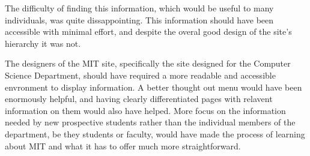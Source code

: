 The difficulty of finding this information, which would be useful to many individuals, was
quite dissappointing. This information should have been accessible with minimal effort, and
despite the overal good design of the site's hierarchy it was not.

The designers of the MIT site, specifically the site designed for the Computer Science Department,
should have required a more readable and accessible envronment to display information. A better
thought out menu would have been enormously helpful, and having clearly differentiated pages with
relavent information on them would also have helped. More focus on the information needed by new 
prospective students rather than the individual members of the department, be they students or 
faculty, would have made the process of learning about MIT and what it has to offer much more 
straightforward.